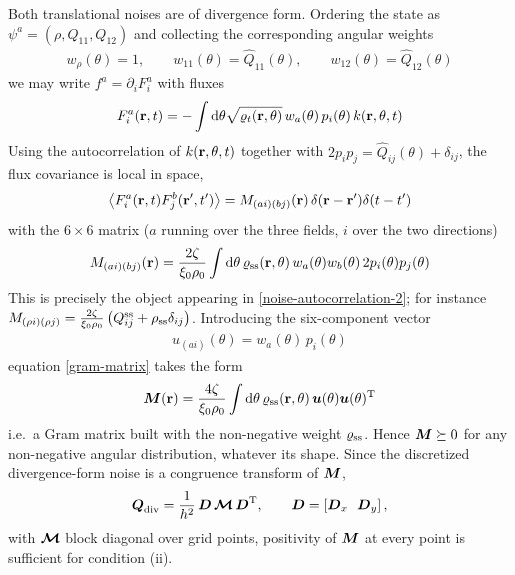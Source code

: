 \documentclass[a5paper]{article}
\begin{document}
Both translational noises are of divergence form. Ordering the state as $\psi^a = (\rho, Q_{11}, Q_{12})$ and collecting the corresponding angular weights
\begin{align}
    \label{noise-weights}
    w_\rho(\theta) = 1, \qquad w_{11}(\theta) = \hat Q_{11}(\theta), \qquad w_{12}(\theta) = \hat Q_{12}(\theta)
\end{align}
we may write $f^a = \partial_i F^a_i$ with fluxes
\begin{align}
    \label{noise-fluxes}
    F^a_i(\r,t) = -\int \d\theta \sqrt{\varrho_t(\r, \theta)}\, w_a(\theta)\, p_i(\theta)\, k(\r, \theta, t)
\end{align}
Using the autocorrelation of $k(\r,\theta,t)$ together with $2 p_i p_j = \hat Q_{ij}(\theta) + \delta_{ij}$, the flux covariance is local in space,
\begin{align}
    \la F^a_i(\r,t) F^b_j(\r',t')\ra = M_{(ai)(bj)}(\r)\, \delta(\r-\r')\delta(t-t')
\end{align}
with the $6\times 6$ matrix ($a$ running over the three fields, $i$ over the two directions)
\begin{align}
    \label{gram-matrix}
    M_{(ai)(bj)}(\r) = \frac{2\zeta}{\xi_0\rho_0}\int \d\theta\, \varrho_\ss(\r,\theta)\, w_a(\theta) w_b(\theta)\, 2 p_i(\theta) p_j(\theta)
\end{align}
This is precisely the object appearing in \cref{noise-autocorrelation-2}; for instance $M_{(\rho i)(\rho j)} = \frac{2\zeta}{\xi_0\rho_0}\left(Q^\ss_{ij} + \rho_\ss \delta_{ij}\right)$. Introducing the six-component vector
\begin{align}
    \label{u-vector}
    u_{(ai)}(\theta) = w_a(\theta)\, p_i(\theta)
\end{align}
equation \eqref{gram-matrix} takes the form
\begin{align}
    \label{gram-form}
    \bs M(\r) = \frac{4\zeta}{\xi_0\rho_0}\int \d\theta\, \varrho_\ss(\r,\theta)\, \bs u(\theta) \bs u(\theta)^\T
\end{align}
i.e.\ a Gram matrix built with the non-negative weight $\varrho_\ss$. Hence $\bs M \succeq 0$ for any non-negative angular distribution, whatever its shape. Since the discretized divergence-form noise is a congruence transform of $\bs M$,
\begin{align}
    \label{Q-congruence}
    \bs Q_{\rm div} = \frac{1}{h^2}\, \bs D\, \bs{\mathcal M}\, \bs D^\T,
    \qquad
    \bs D = \left[\bs D_x\ \ \bs D_y\right],
\end{align}
with $\bs{\mathcal M}$ block diagonal over grid points, positivity of $\bs M$ at every point is sufficient for condition (ii).
\end{document}
